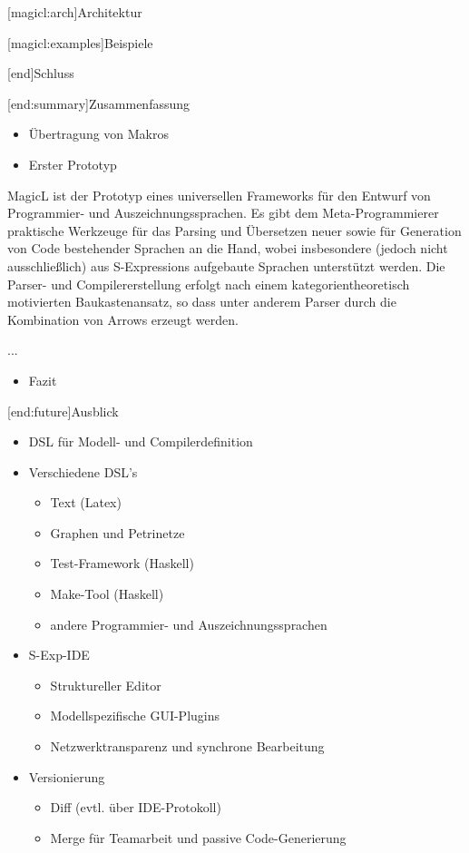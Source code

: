 \documentclass[a4paper, bibgerm]{article}
\newcommand\lsection{}
\newcommand\lsubsection{}
\begin{document}
\lsubsection[magicl:arch]{Architektur}

\lsubsection[magicl:examples]{Beispiele}

\lsection[end]{Schluss}

\lsubsection[end:summary]{Zusammenfassung}

\begin{itemize}
\item Übertragung von Makros
\item Erster Prototyp
\end{itemize}

MagicL ist der Prototyp eines
universellen Frameworks für den Entwurf von Programmier- und
Auszeichnungssprachen. Es gibt dem Meta-Programmierer praktische
Werkzeuge für das Parsing und Übersetzen neuer sowie für Generation von
Code bestehender Sprachen an die Hand, wobei insbesondere (jedoch
nicht ausschließlich) aus S-Expressions aufgebaute Sprachen unterstützt
werden. Die Parser- und Compilererstellung erfolgt nach einem
kategorientheoretisch motivierten Baukastenansatz, so dass
unter anderem Parser durch die Kombination von Arrows erzeugt werden.

...

\begin{itemize}
\item Fazit
\end{itemize}

\lsubsection[end:future]{Ausblick}
\begin{itemize}
\item DSL für Modell- und Compilerdefinition
\item Verschiedene DSL's
  \begin{itemize}
  \item Text (Latex)
  \item Graphen und Petrinetze
  \item Test-Framework (Haskell)
  \item Make-Tool (Haskell)
  \item andere Programmier- und Auszeichnungssprachen
  \end{itemize}
\item S-Exp-IDE
  \begin{itemize}
  \item Struktureller Editor
  \item Modellspezifische GUI-Plugins
  \item Netzwerktransparenz und synchrone Bearbeitung
  \end{itemize}
\item Versionierung
  \begin{itemize}
  \item Diff (evtl. über IDE-Protokoll)
  \item Merge für Teamarbeit und passive Code-Generierung
  \end{itemize}
\end{itemize}
\end{document}
